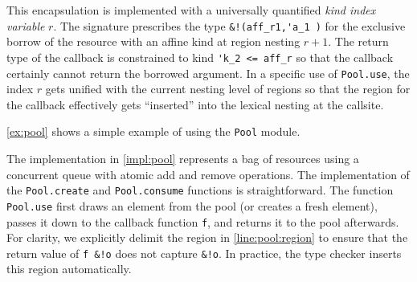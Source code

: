 This encapsulation is implemented with a universally quantified \emph{kind index variable} $r$.
The signature prescribes the type \lstinline/&!(aff_r1,'a_1 )/ for the
exclusive borrow of the resource with an affine kind at region nesting $r+1$. The return
type of the callback is constrained to kind \lstinline/'k_2 <= aff_r/
so that the callback certainly cannot return the borrowed argument.
In a specific use of \lstinline/Pool.use/, the index $r$ gets unified
with the current nesting level of regions so that the region for the
callback effectively gets ``inserted'' into the lexical nesting at the callsite.

\cref{ex:pool} shows a simple example of using the \lstinline/Pool/ module.

The implementation in \cref{impl:pool} represents a bag of resources
using a concurrent queue with atomic add and remove operations.
The implementation of the \lstinline/Pool.create/ and \lstinline/Pool.consume/
functions is straightforward.
The function \lstinline/Pool.use/ first draws
an element from the pool (or creates a fresh element),
passes it down to the callback function \lstinline/f/, and returns
it to the pool afterwards.
For clarity,
we explicitly delimit the region in \cref{line:pool:region} to ensure that
the return value of \lstinline/f &!o/ does not capture \lstinline/&!o/.
In practice, the type checker inserts this region automatically.

